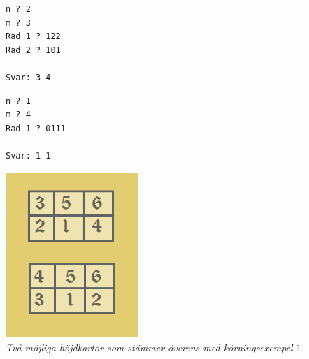 \vspace{0.5cm}

\setlength\columnsep{30pt}
\begin{multicols}{2}

\begin{verbatim}
n ? 2
m ? 3
Rad 1 ? 122
Rad 2 ? 101

Svar: 3 4
\end{verbatim}

\vspace{0.5cm}
\begin{verbatim}
n ? 1
m ? 4
Rad 1 ? 0111

Svar: 1 1
\end{verbatim}

\vfill\columnbreak
\begin{center}
  \includegraphics[width=5cm]{../skolkval/bergskedja/problem_statement/berg_sample}\\
  \emph{Två möjliga höjdkartor som stämmer överens med körningsexempel $1$.}
\end{center}
\vfill
\end{multicols}





